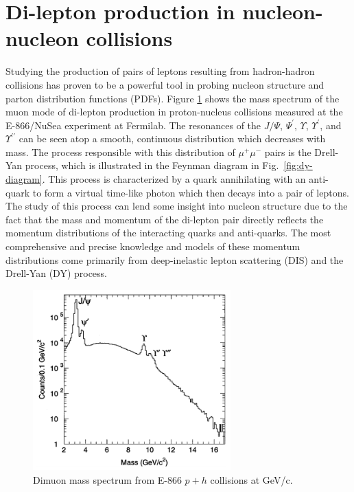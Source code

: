 \section{Di-lepton production in nucleon-nucleon collisions}

Studying the production of pairs of leptons resulting from hadron-hadron collisions has proven to be a powerful tool in probing nucleon structure and parton distribution functions (PDFs). Figure \ref{fig:DY-spectrum} shows the mass spectrum of the muon mode of di-lepton production in proton-nucleus collisions measured at the E-866/NuSea experiment at Fermilab\cite{PhysRevLett.80.3715}. The resonances of the $J/\Psi$, $\Psi^\prime$, $\Upsilon$, $\Upsilon^\prime$, and $\Upsilon^{\prime\prime}$ can be seen atop a smooth, continuous distribution which decreases with mass. The process responsible with this distribution of $\mu^+\mu^-$ pairs is the Drell-Yan process\cite{PhysRevLett.25.316}, which is illustrated in the Feynman diagram in Fig.~\ref{fig:dy-diagram}. This process is characterized by a quark annihilating with an anti-quark to form a virtual time-like photon which then decays into a pair of leptons. The study of this process can lend some insight into nucleon structure due to the fact that the mass and momentum of the di-lepton pair directly reflects the momentum distributions of the interacting quarks and anti-quarks. The most comprehensive and precise knowledge and models of these momentum distributions come primarily from deep-inelastic lepton scattering (DIS) and the Drell-Yan (DY) process.

\begin{figure}
	\centering
	\includegraphics[width=3in]{figures/background/DY-spectrum-e866.png}
	\caption{Dimuon mass spectrum from E-866 $p+h$ collisions at \unit[800]{GeV/c}\cite{PhysRevLett.80.3715}.}
	\label{fig:DY-spectrum}
\end{figure}

